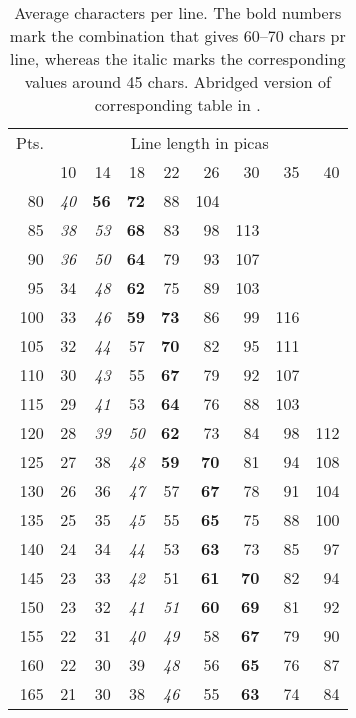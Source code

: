 \documentclass[10pt,letterpaper,extrafontsizes]{memoir}
\begin{document}
\begin{table}
\centering
\caption{Average characters per line. The bold numbers mark the
  combination that gives 60--70 chars pr line, whereas the italic
  marks the corresponding values around 45 chars. Abridged version of
  corresponding table in \cite{BRINGHURST99}.} \label{tab:copyfitting}
\begin{tabular}{r|rrrrrrrr} \hline
Pts. & \multicolumn{8}{c}{Line length in picas} \\
     & 10 & 14 & 18 & 22 & 26  & 30  & 35 & 40 \\ \hline
80   & \textit{40} & \textbf{56} & \textbf{72} & 88 & 104 &     &    &    \\
85   & \textit{38} & \textit{53} & \textbf{68} & 83 & 98 & 113 &    &    \\
90   & \textit{36} & \textit{50} & \textbf{64} & 79 & 93 & 107 &    &    \\
95   & 34 & \textit{48} & \textbf{62} & 75 & 89 & 103 &    &    \\
100  & 33 & \textit{46} & \textbf{59} & \textbf{73} & 86 & 99 & 116 &   \\
105  & 32 & \textit{44} & 57 & \textbf{70} & 82 & 95 & 111 &   \\
110  & 30 & \textit{43} & 55 & \textbf{67} & 79 & 92 & 107 &   \\
115  & 29 & \textit{41} & 53 & \textbf{64} & 76 & 88 & 103 &   \\
120  & 28 & \textit{39} & \textit{50} & \textbf{62} & 73 & 84 & 98 & 112 \\
125  & 27 & 38 & \textit{48} & \textbf{59} & \textbf{70} & 81 & 94 & 108 \\
130  & 26 & 36 & \textit{47} & 57 & \textbf{67} & 78 & 91 & 104 \\
135  & 25 & 35 & \textit{45} & 55 & \textbf{65} & 75 & 88 & 100 \\
140  & 24 & 34 & \textit{44} & 53 & \textbf{63} & 73 & 85 & 97 \\
145  & 23 & 33 & \textit{42} & 51 & \textbf{61} & \textbf{70} & 82 & 94 \\
150  & 23 & 32 & \textit{41} & \textit{51} & \textbf{60} & \textbf{69} & 81 & 92 \\
155  & 22 & 31 & \textit{40} & \textit{49} & 58 & \textbf{67} & 79 & 90 \\
160  & 22 & 30 & 39 & \textit{48} & 56 & \textbf{65} & 76 & 87 \\
165  & 21 & 30 & 38 & \textit{46} & 55 & \textbf{63} & 74 & 84 \\

\end{tabular}
\end{table}
\end{document}
